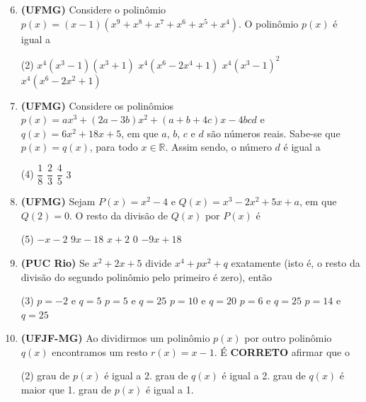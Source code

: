 \documentclass[12pt,a4paper]{article}
\begin{document}
\newpage %

\begin{enumerate}[leftmargin=*, itemsep=0.35cm]
    \setcounter{enumi}{5}

    \item \textbf{(UFMG)} Considere o polinômio $p(x) = (x - 1)(x^9 + x^8 + x^7 + x^6 + x^5 + x^4)$. O polinômio $p(x)$ é igual a
    \begin{tasks}(2)
        \task $x^4(x^3 - 1)(x^3 + 1)$
        \task $x^4(x^6 - 2x^4 + 1)$
        \task $x^4(x^3 - 1)^2$
        \task $x^4(x^6 - 2x^2 + 1)$
    \end{tasks}

    \item \textbf{(UFMG)} Considere os polinômios $p(x) = ax^3 + (2a - 3b)x^2 + (a + b + 4c)x - 4bcd$ e $q(x) = 6x^2 + 18x + 5$, em que $a$, $b$, $c$ e $d$ são números reais. Sabe-se que $p(x) = q(x)$, para todo $x \in \mathbb{R}$. Assim sendo, o número $d$ é igual a
    \begin{tasks}(4)
        \task $\dfrac{1}{8}$
        \task $\dfrac{2}{3}$
        \task $\dfrac{4}{5}$
        \task $3$
    \end{tasks}

    \item \textbf{(UFMG)} Sejam $P(x) = x^2 - 4$ e $Q(x) = x^3 - 2x^2 + 5x + a$, em que $Q(2) = 0$. O resto da divisão de $Q(x)$ por $P(x)$ é
    \begin{tasks}(5)
        \task $-x - 2$
        \task $9x - 18$
        \task $x + 2$
        \task $0$
        \task $-9x + 18$
    \end{tasks}

    \item \textbf{(PUC Rio)} Se $x^2 + 2x + 5$ divide $x^4 + px^2 + q$ exatamente (isto é, o resto da divisão do segundo polinômio pelo primeiro é zero), então
    \begin{tasks}(3)
        \task $p = -2$ e $q = 5$
        \task $p = 5$ e $q = 25$
        \task $p = 10$ e $q = 20$
        \task $p = 6$ e $q = 25$
        \task $p = 14$ e $q = 25$
    \end{tasks}

    \item \textbf{(UFJF-MG)} Ao dividirmos um polinômio $p(x)$ por outro polinômio $q(x)$ encontramos um resto $r(x) = x - 1$. É \textbf{CORRETO} afirmar que o
    \begin{tasks}(2)
        \task grau de $p(x)$ é igual a 2.
        \task grau de $q(x)$ é igual a 2.
        \task grau de $q(x)$ é maior que 1.
        \task grau de $p(x)$ é igual a 1.
    \end{tasks}
\end{enumerate}
\end{document}
